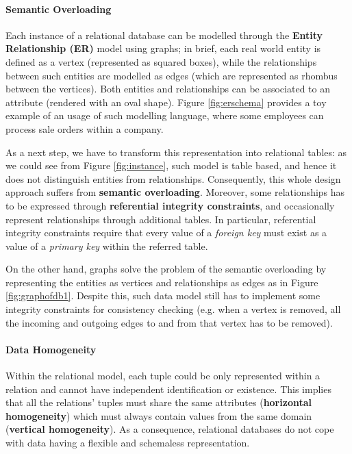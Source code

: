 \paragraph*{Semantic Overloading}\label{subsec:semanticoverloadrel}
Each instance of a relational database can be modelled through the \textbf{Entity Relationship (ER)} model  \cite{Chen1976} using graphs; in brief, each real world entity is defined as a vertex (represented as squared boxes), while the relationships between such entities are modelled as edges (which are represented as rhombus between the vertices). Both entities and relationships can be associated to an attribute (rendered with an oval shape). Figure \ref{fig:erschema} provides a toy example of an usage of such modelling language, where some employees can process sale orders within a company. 

As a next step, we have to transform this representation into relational tables: as we could see from Figure \ref{fig:instance}, such model is table based, and hence it does not distinguish  entities from relationships. Consequently, this whole design approach suffers from \textbf{semantic overloading}. Moreover, some relationships has to be expressed through \textbf{referential integrity constraints}, and occasionally represent relationships through additional tables. In particular, {referential integrity constraints} require that every value of a \textit{foreign key} must exist as a value of a \textit{primary key} within the referred table. 

On the other hand, graphs solve the problem of the semantic overloading by representing the entities as vertices and relationships as edges as in Figure \ref{fig:graphofdb1}. Despite this, such data model still has to implement some integrity constraints for consistency checking (e.g. when a vertex is removed, all the incoming and outgoing edges to and from that vertex has to be removed).

\paragraph*{Data Homogeneity}\label{par:homog}
Within the relational model, each tuple could be only represented within a relation and cannot have independent identification or existence. This  implies that all the relations' tuples must share the same attributes (\textbf{horizontal homogeneity}) which must always contain values from the same domain (\textbf{vertical homogeneity}). As a consequence, relational databases do not cope  with data  having a flexible and schemaless representation. 

